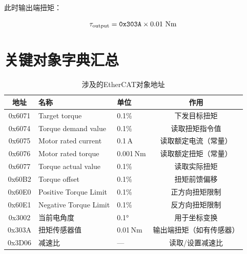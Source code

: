 \documentclass[12pt,a4paper]{article}
\begin{document}
此时输出端扭矩：

\begin{equation}
\tau_{\text{output}} = \text{\texttt{0x303A}} \times 0.01\ \text{Nm}
\end{equation}

\section{关键对象字典汇总}

\begin{table}[h]
\centering
\caption{涉及的EtherCAT对象地址}
\begin{tabular}{cllc}
\toprule
\textbf{地址} & \textbf{名称} & \textbf{单位} & \textbf{作用} \\
\midrule
0x6071 & Target torque & 0.1\% & 下发目标扭矩 \\
0x6074 & Torque demand value & 0.1\% & 读取扭矩指令值 \\
0x6075 & Motor rated current & 0.1\,A & 读取额定电流（常量） \\
0x6076 & Motor rated torque & 0.001\,Nm & 读取额定扭矩（常量） \\
0x6077 & Torque actual value & 0.1\% & 读取实际扭矩 \\
0x60B2 & Torque offset & 0.1\% & 扭矩前馈偏移 \\
0x60E0 & Positive Torque Limit & 0.1\% & 正方向扭矩限制 \\
0x60E1 & Negative Torque Limit & 0.1\% & 反方向扭矩限制 \\
0x3002 & 当前电角度 & 0.1° & 用于坐标变换 \\
0x303A & 扭矩传感器值 & 0.01\,Nm & 输出端扭矩（如有传感器） \\
0x3D06 & 减速比 & — & 读取/设置减速比 \\
\bottomrule
\end{tabular}
\end{table}
\end{document}
